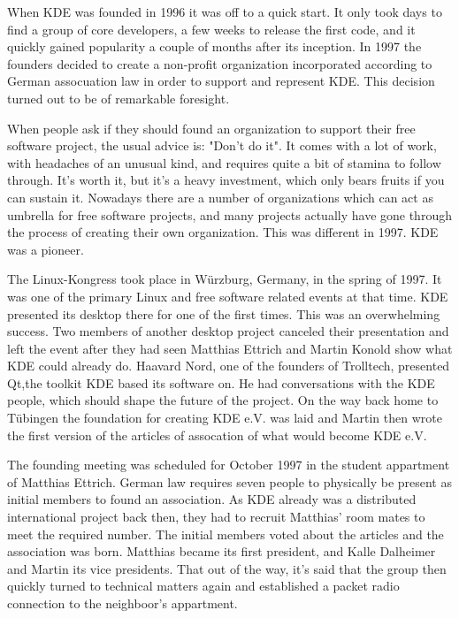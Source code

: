 

\noindent{}When KDE was founded in 1996 it was off to a quick start. It only took days to find a group of core developers, a few weeks to release the first code, and it quickly gained popularity a couple of months after its inception. In 1997 the founders decided to create a non-profit organization incorporated according to German assocuation law in order to support and represent KDE. This decision turned out to be of remarkable foresight.

When people ask if they should found an organization to support their free software project, the usual advice is: "Don't do it". It comes with a lot of work, with headaches of an unusual kind, and requires quite a bit of stamina to follow through. It's worth it, but it's a heavy investment, which only bears fruits if you can sustain it. Nowadays there are a number of organizations which can act as umbrella for free software projects, and many projects actually have gone through the process of creating their own organization. This was different in 1997. KDE was a pioneer.

The Linux-Kongress took place in Würzburg, Germany, in the spring of 1997. It was one of the primary Linux and free software related events at that time. KDE presented its desktop there for one of the first times. This was an overwhelming success. Two members of another desktop project canceled their presentation and left the event after they had seen Matthias Ettrich and Martin Konold show what KDE could already do. Haavard Nord, one of the founders of Trolltech, presented Qt,the toolkit KDE based its software on. He had conversations with the KDE people, which should shape the future of the project. On the way back home to Tübingen the foundation for creating KDE e.V. was laid and Martin then wrote the first version of the articles of assocation of what would become KDE e.V.

The founding meeting was scheduled for October 1997 in the student appartment of Matthias Ettrich. German law requires seven people to physically be present as initial members to found an association. As KDE already was a distributed international project back then, they had to recruit Matthias' room mates to meet the required number. The initial members voted about the articles and the association was born. Matthias became its first president, and Kalle Dalheimer and Martin its vice presidents. That out of the way, it's said that the group then quickly turned to technical matters again and established a packet radio connection to the neighboor's appartment.

